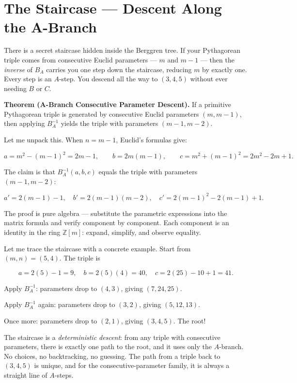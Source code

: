 \documentclass[11pt,twoside,openright]{book}
\theoremstyle{definition}
\theoremstyle{remark}
\begin{document}
\section{The Staircase --- Descent Along the A-Branch}

There is a secret staircase hidden inside the Berggren tree. If your Pythagorean triple comes from consecutive Euclid parameters --- $m$ and $m - 1$ --- then the \textit{inverse} of $B_A$ carries you one step down the staircase, reducing $m$ by exactly one. Every step is an $A$-step. You descend all the way to $(3, 4, 5)$ without ever needing $B$ or $C$.

\textbf{Theorem (A-Branch Consecutive Parameter Descent).} If a primitive Pythagorean triple is generated by consecutive Euclid parameters $(m, m - 1)$, then applying $B_A^{-1}$ yields the triple with parameters $(m - 1, m - 2)$.

Let me unpack this. When $n = m - 1$, Euclid's formulas give:

\[a = m^2 - (m-1)^2 = 2m - 1, \qquad b = 2m(m-1), \qquad c = m^2 + (m-1)^2 = 2m^2 - 2m + 1.\]

The claim is that $B_A^{-1}(a, b, c)$ equals the triple with parameters $(m - 1, m - 2)$:

\[a' = 2(m-1) - 1, \quad b' = 2(m-1)(m-2), \quad c' = 2(m-1)^2 - 2(m-1) + 1.\]

The proof is pure algebra --- substitute the parametric expressions into the matrix formula and verify component by component. Each component is an identity in the ring $\mathbb{Z}[m]$: expand, simplify, and observe equality.

Let me trace the staircase with a concrete example. Start from $(m, n) = (5, 4)$. The triple is

\[a = 2(5) - 1 = 9, \quad b = 2(5)(4) = 40, \quad c = 2(25) - 10 + 1 = 41.\]

Apply $B_A^{-1}$: parameters drop to $(4, 3)$, giving $(7, 24, 25)$.

Apply $B_A^{-1}$ again: parameters drop to $(3, 2)$, giving $(5, 12, 13)$.

Once more: parameters drop to $(2, 1)$, giving $(3, 4, 5)$. The root!


The staircase is a \textit{deterministic descent}: from any triple with consecutive parameters, there is exactly one path to the root, and it uses only the $A$-branch. No choices, no backtracking, no guessing. The path from a triple back to $(3, 4, 5)$ is unique, and for the consecutive-parameter family, it is always a straight line of $A$-steps.
\end{document}
